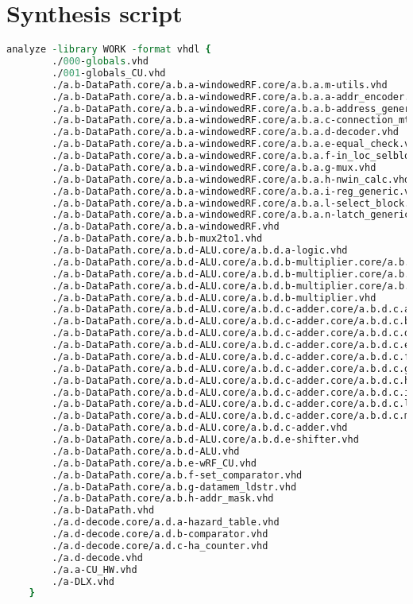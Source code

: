 \section{Synthesis script}
\begin{lstlisting}[language=tcl,caption={TCL script for the DLX synthesis},label=tcl_syn]
	analyze -library WORK -format vhdl {
		./000-globals.vhd
		./001-globals_CU.vhd
		./a.b-DataPath.core/a.b.a-windowedRF.core/a.b.a.m-utils.vhd
		./a.b-DataPath.core/a.b.a-windowedRF.core/a.b.a.a-addr_encoder.vhd
		./a.b-DataPath.core/a.b.a-windowedRF.core/a.b.a.b-address_generator.vhd
		./a.b-DataPath.core/a.b.a-windowedRF.core/a.b.a.c-connection_mtx.vhd
		./a.b-DataPath.core/a.b.a-windowedRF.core/a.b.a.d-decoder.vhd
		./a.b-DataPath.core/a.b.a-windowedRF.core/a.b.a.e-equal_check.vhd
		./a.b-DataPath.core/a.b.a-windowedRF.core/a.b.a.f-in_loc_selblock.vhd
		./a.b-DataPath.core/a.b.a-windowedRF.core/a.b.a.g-mux.vhd
		./a.b-DataPath.core/a.b.a-windowedRF.core/a.b.a.h-nwin_calc.vhd
		./a.b-DataPath.core/a.b.a-windowedRF.core/a.b.a.i-reg_generic.vhd
		./a.b-DataPath.core/a.b.a-windowedRF.core/a.b.a.l-select_block.vhd
		./a.b-DataPath.core/a.b.a-windowedRF.core/a.b.a.n-latch_generic.vhd
		./a.b-DataPath.core/a.b.a-windowedRF.vhd
		./a.b-DataPath.core/a.b.b-mux2to1.vhd
		./a.b-DataPath.core/a.b.d-ALU.core/a.b.d.a-logic.vhd
		./a.b-DataPath.core/a.b.d-ALU.core/a.b.d.b-multiplier.core/a.b.d.b.a-adder.vhd
		./a.b-DataPath.core/a.b.d-ALU.core/a.b.d.b-multiplier.core/a.b.d.b.b-encoder.vhd
		./a.b-DataPath.core/a.b.d-ALU.core/a.b.d.b-multiplier.core/a.b.d.b.c-mux3_1.vhd
		./a.b-DataPath.core/a.b.d-ALU.core/a.b.d.b-multiplier.vhd
		./a.b-DataPath.core/a.b.d-ALU.core/a.b.d.c-adder.core/a.b.d.c.a-carry_generator.vhd
		./a.b-DataPath.core/a.b.d-ALU.core/a.b.d.c-adder.core/a.b.d.c.b-carry_select_block.vhd
		./a.b-DataPath.core/a.b.d-ALU.core/a.b.d.c-adder.core/a.b.d.c.d-fa.vhd
		./a.b-DataPath.core/a.b.d-ALU.core/a.b.d.c-adder.core/a.b.d.c.e-GG.vhd
		./a.b-DataPath.core/a.b.d-ALU.core/a.b.d.c-adder.core/a.b.d.c.f-mux21_generic.vhd
		./a.b-DataPath.core/a.b.d-ALU.core/a.b.d.c-adder.core/a.b.d.c.g-PG.vhd
		./a.b-DataPath.core/a.b.d-ALU.core/a.b.d.c-adder.core/a.b.d.c.h-prop_gen.vhd
		./a.b-DataPath.core/a.b.d-ALU.core/a.b.d.c-adder.core/a.b.d.c.i-prop_gen_generic.vhd
		./a.b-DataPath.core/a.b.d-ALU.core/a.b.d.c-adder.core/a.b.d.c.l-rca_generic.vhd
		./a.b-DataPath.core/a.b.d-ALU.core/a.b.d.c-adder.core/a.b.d.c.m-sum_generator.vhd
		./a.b-DataPath.core/a.b.d-ALU.core/a.b.d.c-adder.vhd
		./a.b-DataPath.core/a.b.d-ALU.core/a.b.d.e-shifter.vhd
		./a.b-DataPath.core/a.b.d-ALU.vhd
		./a.b-DataPath.core/a.b.e-wRF_CU.vhd
		./a.b-DataPath.core/a.b.f-set_comparator.vhd
		./a.b-DataPath.core/a.b.g-datamem_ldstr.vhd
		./a.b-DataPath.core/a.b.h-addr_mask.vhd
		./a.b-DataPath.vhd
		./a.d-decode.core/a.d.a-hazard_table.vhd
		./a.d-decode.core/a.d.b-comparator.vhd
		./a.d-decode.core/a.d.c-ha_counter.vhd
		./a.d-decode.vhd
		./a.a-CU_HW.vhd
		./a-DLX.vhd
	}
	

\end{lstlisting}
